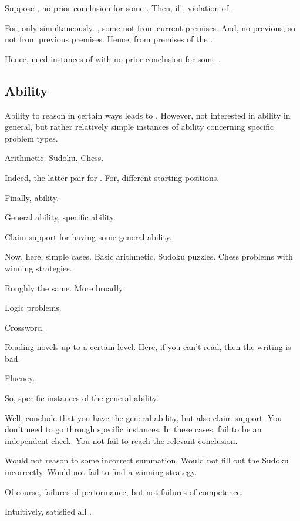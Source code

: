 \begin{note}
  Suppose \ragged{}, no prior conclusion for some \jag{}.
  Then, if \csN{}, violation of \ESU{}.

  For, only \csN{} simultaneously.
  \jag{}, some not from current premises.
  And, no previous, so not from previous premises.
  Hence, \csN{} from premises of the \jag{}.

  Hence, need instances of \ragged{} with no prior conclusion for some \jag{}.
\end{note}


\subsection{Ability}
\label{sec:ability}

\begin{note}[Ability]
  Ability to reason in certain ways leads to .
  However, not interested in ability in general, but rather relatively simple instances of ability concerning specific problem types.

  Arithmetic.
  Sudoku.
  Chess.

  Indeed, the latter pair for .
  For, different starting positions.
  
\end{note}

\begin{note}
  Finally, ability.

  General ability, specific ability.

  Claim support for having some general ability.

  Now, here, simple cases.
  Basic arithmetic.
  Sudoku puzzles.
  Chess problems with winning strategies.

  Roughly the same.
  More broadly:

  Logic problems.

  Crossword.

  Reading novels up to a certain level.
  Here, if you can't read, then the writing is bad.

  Fluency.

  So, specific instances of the general ability.
\end{note}

\begin{note}
  Well, conclude that you have the general ability, but also claim support.
  You don't need to go through specific instances.
  In these cases, fail to be an independent check.
  You not fail to reach the relevant conclusion.

  Would not reason to some incorrect summation.
  Would not fill out the Sudoku incorrectly.
  Would not fail to find a winning strategy.

  Of course, failures of performance, but not failures of competence.

  Intuitively, satisfied all .
\end{note}


